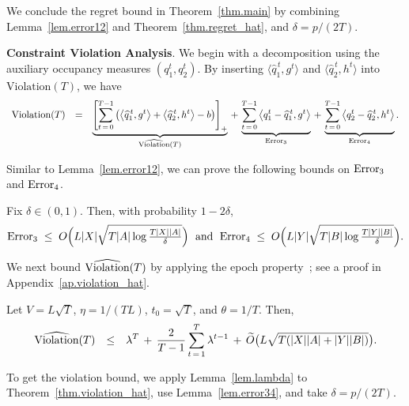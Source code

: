 \documentclass[12pt, final]{l4dc2023}
\begin{document}
We conclude the regret bound in Theorem~\ref{thm.main} by combining Lemma~\ref{lem.error12} and Theorem~\ref{thm.regret_hat}, and $\delta=p/(2T)$.

\noindent\textbf{Constraint Violation Analysis}. 
We begin with a decomposition using the auxiliary occupancy measures $(q_1^t, q_2^t)$. By inserting $\langle \hat q_1^{\,t},g^{t}\rangle$ and $\langle \hat q_2^{\,t},h^{t}\rangle$ into $\text{Violation}(T) $, we have
\[
\begin{array}{rcl}
\text{Violation}(T) 
&=&
\underbrace{\sbr{\sum_{t\,=\,0}^{T-1} \rbr{\inner{\hat q_1^{\,t}}{g^t}+\inner{\hat q_2^{\,t}}{h^t}-b}}_+}_{\hat{\text{\normalfont Violation}}(T)}
\,+\,
\underbrace{
	\sum_{t\,=\,0}^{T-1} \inner{q_1^t-\hat q_1^{\,t}}{g^t}
}_{\text{\normalfont Error}_3}
\, + \,
\underbrace{
	\sum_{t\,=\,0}^{T-1}\inner{q_2^t-\hat q_2^{\,t}}{h^t}
}_{\text{\normalfont Error}_4}.
\end{array}
\]

Similar to Lemma~\ref{lem.error12}, we can prove the following bounds on ${\text{\normalfont Error}_3}$ and ${\text{\normalfont Error}_4}$.
\begin{lemma}\label{lem.error34}
	Fix $\delta\in(0,1)$. Then, with probability $1-2\delta$,
	\[
	{\text{\normalfont Error}_3} \; \leq \; O\Big( L|X|\sqrt{T|A| \log\tfrac{T|X||A|}{\delta}}\Big)
	\; \text{ and } \;
	{\text{\normalfont Error}_4} \; \leq \; O\Big(L|Y|\sqrt{T|B| \log\tfrac{T|Y||B|}{\delta}}\Big).
	\]
\end{lemma}

We next bound ${\hat{\text{\normalfont Violation}}(T)}$ by applying the epoch property~\citep{jaksch2010near}; see a proof in Appendix~\ref{ap.violation_hat}.

\begin{theorem}\label{thm.violation_hat}
	Let $V=L\sqrt{T}$, $\eta = 1/(TL)$, $t_0=\sqrt{T}$, and $\theta = 1/T$. Then,
	\[
	\begin{array}{rcl}
	{\hat{\text{\normalfont Violation}}(T)}
	&\leq&\displaystyle
	\lambda^T
	\,+\, 
	\frac{2 }{T-1}
	\sum_{t\,=\,1}^{T} \lambda^{t-1}
	\,+\,
	\tilde O\big(L\sqrt{ T(|X||A|+|Y||B|)}\big).
	\end{array}
	\]
\end{theorem}

To get the violation bound, we apply Lemma~\ref{lem.lambda} to Theorem~\ref{thm.violation_hat}, use Lemma~\ref{lem.error34}, and take $\delta=p/(2T)$.
\end{document}
